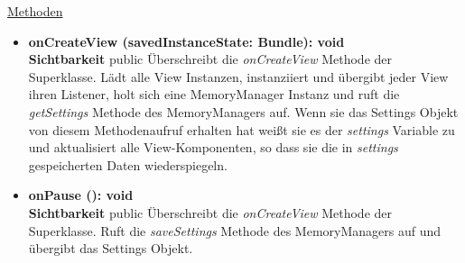 \underline{Methoden}
\begin{itemize}
\itemsep0pt
\item \textbf{onCreateView (savedInstanceState: Bundle): void}\hfill\\
\textbf{Sichtbarkeit} public\newline
Überschreibt die \textit{onCreateView} Methode der Superklasse. Lädt alle View Instanzen, instanziiert und übergibt jeder View ihren Listener, holt sich eine MemoryManager Instanz und ruft die \textit{getSettings} Methode des MemoryManagers auf. Wenn sie das Settings Objekt von diesem Methodenaufruf erhalten hat weißt sie es der \textit{settings} Variable zu und aktualisiert alle View-Komponenten, so dass sie die in \textit{settings} gespeicherten Daten wiederspiegeln.

\item \textbf{onPause (): void}\hfill\\
\textbf{Sichtbarkeit} public\newline
Überschreibt die \textit{onCreateView} Methode der Superklasse. Ruft die \textit{saveSettings} Methode des MemoryManagers auf und übergibt das Settings Objekt.

\end{itemize}